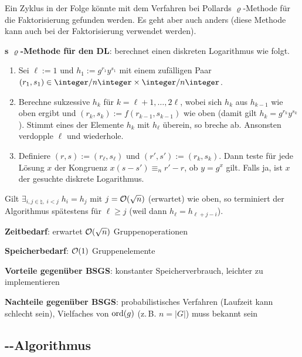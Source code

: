 \linie

Ein Zyklus in der Folge könnte mit dem Verfahren bei Pollards $\varrho$-Methode für die
Faktorisierung gefunden werden.
Es geht aber auch anders (diese Methode kann auch bei der Faktorisierung verwendet werden).

\textbf{s $\varrho$-Methode für den DL}:
 berechnet einen
diskreten Logarithmus wie folgt.
\begin{enumerate}
    \item
    Sei $\ell := 1$ und $h_1 := g^{r_1} y^{s_1}$ mit einem zufälligen Paar
    $(r_1, s_1) \in \ZnZ \times \ZnZ$.

    \item
    Berechne sukzessive $h_k$ für $k = \ell + 1, \dotsc, 2\ell$,
    wobei sich $h_k$ aus $h_{k-1}$ wie oben ergibt
    und $(r_k, s_k) := f(r_{k-1}, s_{k-1})$ wie oben
    (damit gilt $h_k = g^{r_k} y^{s_k}$).
    Stimmt eines der Elemente $h_k$ mit $h_\ell$ überein, so breche ab.
    Ansonsten verdopple $\ell$ und wiederhole.

    \item
    Definiere $(r, s) := (r_\ell, s_\ell)$ und $(r', s') := (r_k, s_k)$.
    Dann teste für jede Lösung $x$ der Kongruenz $x(s - s') \equiv_n r' - r$, ob $y = g^x$ gilt.
    Falls ja, ist $x$ der gesuchte diskrete Logarithmus.
\end{enumerate}
Gilt $\exists_{i, j \in \natural,\; i < j}\; h_i = h_j$ mit $j = \mathcal{O}(\sqrt{n})$ (erwartet)
wie oben, so terminiert der Algorithmus spätestens für $\ell \ge j$
(weil dann $h_\ell = h_{\ell+j-i}$).

\linie

\textbf{Zeitbedarf}:
erwartet $\mathcal{O}(\sqrt{n})$ Gruppenoperationen

\textbf{Speicherbedarf}:
$\mathcal{O}(1)$ Gruppenelemente

\linie

\textbf{Vorteile gegenüber BSGS}:
konstanter Speicherverbrauch,
leichter zu implementieren

\textbf{Nachteile gegenüber BSGS}:
probabilistisches Verfahren (Laufzeit kann schlecht sein),
Vielfaches von $\operatorname{ord}(g)$ (z.\,B. $n = |G|$) muss bekannt sein

\pagebreak

\subsection{%
    --Algorithmus%
}

